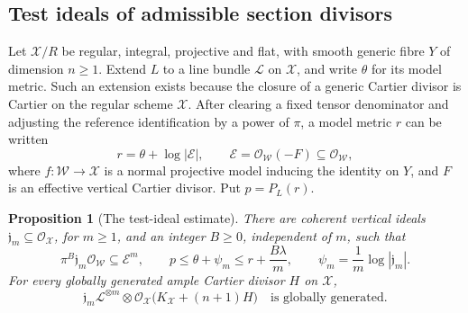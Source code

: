 \documentclass[11pt]{amsart}
\newtheorem{proposition}[theorem]{Proposition}
\theoremstyle{definition}
\theoremstyle{remark}
\numberwithin{equation}{section}
\newcommand{\OO}{\mathcal O}
\newcommand{\cX}{\mathscr X}
\newcommand{\cW}{\mathscr W}
\newcommand{\cL}{\mathscr L}
\newcommand{\cE}{\mathscr E}
\begin{document}
\subsection{Test ideals of admissible section divisors}\label{subsec:test-ideals}

Let \(\cX/R\) be regular, integral, projective and flat, with smooth
generic fibre \(Y\) of dimension \(n\ge1\). Extend \(L\) to a line bundle
\(\cL\) on \(\cX\), and write \(\theta\) for its model metric.
Such an extension exists because the closure of a generic Cartier divisor
is Cartier on the regular scheme \(\cX\).
After clearing a fixed tensor denominator and adjusting the reference
identification by a power of \(\pi\), a model metric \(r\) can be written
\begin{equation}\label{eq:model-obstacle}
 r=\theta+\log|\cE|,
 \qquad \cE=\OO_{\cW}(-F)\subseteq\OO_{\cW},
\end{equation}
where \(f:\cW\to\cX\) is a normal projective model inducing the identity
on \(Y\), and \(F\) is an effective vertical Cartier divisor.
Put \(p=P_L(r)\).

\begin{proposition}[The test-ideal estimate]\label{prop:test-ideal-estimate}
There are coherent vertical ideals \(\mathfrak j_m\subseteq\OO_{\cX}\),
for \(m\ge1\), and an integer \(B\ge0\), independent of \(m\), such that
\begin{equation}\label{eq:test-ideal-bounds}
 \pi^B\mathfrak j_m\OO_{\cW}\subseteq\cE^m,\qquad
 p\le\theta+\psi_m\le r+\frac{B\lambda}{m},
 \qquad \psi_m=\frac1m\log|\mathfrak j_m|.
\end{equation}
For every globally generated ample Cartier divisor \(H\) on \(\cX\),
\begin{equation}\label{eq:test-ideal-generation}
 \mathfrak j_m\cL^{\otimes m}\otimes
 \OO_{\cX}\bigl(K_{\cX}+(n+1)H\bigr)
 \quad\text{is globally generated.}
\end{equation}
\end{proposition}
\end{document}
